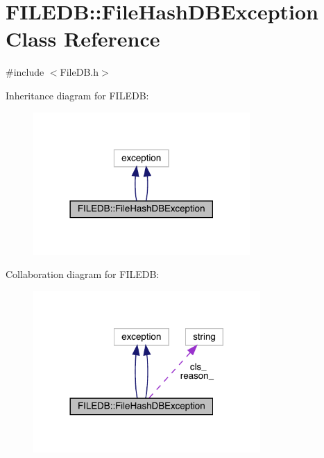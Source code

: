 \hypertarget{classFILEDB_1_1FileHashDBException}{}\section{F\+I\+L\+E\+DB\+:\+:File\+Hash\+D\+B\+Exception Class Reference}
\label{classFILEDB_1_1FileHashDBException}


{\ttfamily \#include $<$File\+D\+B.\+h$>$}



Inheritance diagram for F\+I\+L\+E\+DB\+:\nopagebreak
\begin{figure}[H]
\begin{center}
\leavevmode
\includegraphics[width=234pt]{d9/df8/classFILEDB_1_1FileHashDBException__inherit__graph}
\end{center}
\end{figure}


Collaboration diagram for F\+I\+L\+E\+DB\+:\nopagebreak
\begin{figure}[H]
\begin{center}
\leavevmode
\includegraphics[width=245pt]{d8/da2/classFILEDB_1_1FileHashDBException__coll__graph}
\end{center}
\end{figure}
